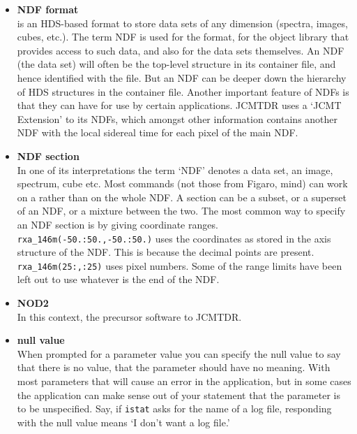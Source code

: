 \documentclass[11pt,noabs]{starlink}
\begin{document}
\begin{itemize}
\item\textbf{\label{glossndf}NDF format}\\
   is an HDS-based format to store
   data sets of any dimension (spectra, images, cubes, etc.). The term
   NDF is used for the format, for the object library that provides
   access to such data, and also for the data sets themselves. An NDF
   (the data set) will often be the top-level structure in its container
   file, and hence identified with the file. But an NDF can be deeper
   down the hierarchy of HDS structures in the container file. Another
   important feature of NDFs is that they can have
   for use by certain applications. JCMTDR uses a `JCMT Extension' to its
   NDFs, which amongst other information contains another NDF with the
   local sidereal time for each pixel of the main NDF.

\item\textbf{\label{glossndfsection}NDF section}\\
   In one of its interpretations
   the term `NDF' denotes a data set, an image, spectrum, cube etc.
   Most commands (not those from Figaro, mind) can work on a
   rather than on the whole NDF. A section can be a subset, or a
   superset of an NDF, or a mixture between the two. The most common way
   to specify an NDF section is by giving coordinate ranges.
   \texttt{rxa\_146m(-50.:50.,-50.:50.)} uses the coordinates as stored
   in the axis structure of the NDF. This is because the decimal points
   are present. \texttt{rxa\_146m(25:,:25)} uses pixel numbers. Some of
   the range limits have been left out to use whatever is the end of the
   NDF.

\item\textbf{\label{glossnod2}NOD2}\\
   In this context, the precursor software to
   JCMTDR.

\item\textbf{\label{glossnullvalue}null value}\\
   When prompted for a parameter
   value you can specify the null value to say that there is no value,
   that the parameter should have no meaning. With most parameters that
   will cause an error in the application, but in some cases the
   application can make sense out of your statement that the parameter
   is to be unspecified. Say, if \texttt{istat} asks for the name of a log
   file, responding with the null value means `I don't want a log file.'


\end{itemize}
\end{document}
